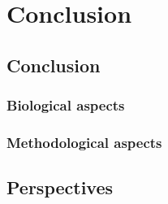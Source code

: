 \renewcommand{\chaptername}{Chapter} 
\chapter{Conclusion}\label{chap10}

\section{Conclusion}


\subsection {Biological aspects} 

\subsection {Methodological aspects}

\section{Perspectives} 